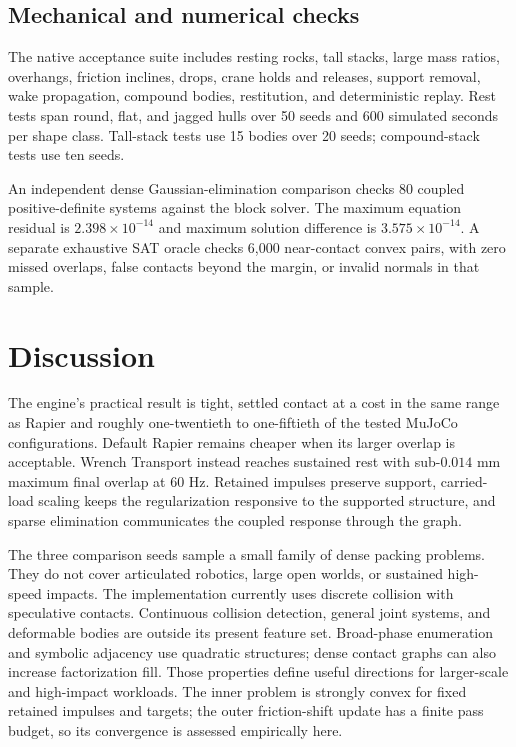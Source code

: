 \documentclass[10pt,letterpaper]{article}
\begin{document}
\subsection{Mechanical and numerical checks}
The native acceptance suite includes resting rocks, tall stacks, large mass ratios, overhangs, friction inclines, drops, crane holds and releases, support removal, wake propagation, compound bodies, restitution, and deterministic replay. Rest tests span round, flat, and jagged hulls over 50 seeds and 600 simulated seconds per shape class. Tall-stack tests use 15 bodies over 20 seeds; compound-stack tests use ten seeds.

An independent dense Gaussian-elimination comparison checks 80 coupled positive-definite systems against the block solver. The maximum equation residual is $2.398\times10^{-14}$ and maximum solution difference is $3.575\times10^{-14}$. A separate exhaustive SAT oracle checks 6,000 near-contact convex pairs, with zero missed overlaps, false contacts beyond the margin, or invalid normals in that sample.

\newpage
\section{Discussion}
The engine's practical result is tight, settled contact at a cost in the same range as Rapier and roughly one-twentieth to one-fiftieth of the tested MuJoCo configurations. Default Rapier remains cheaper when its larger overlap is acceptable. Wrench Transport instead reaches sustained rest with sub-$0.014$ mm maximum final overlap at 60 Hz. Retained impulses preserve support, carried-load scaling keeps the regularization responsive to the supported structure, and sparse elimination communicates the coupled response through the graph.

The three comparison seeds sample a small family of dense packing problems. They do not cover articulated robotics, large open worlds, or sustained high-speed impacts. The implementation currently uses discrete collision with speculative contacts. Continuous collision detection, general joint systems, and deformable bodies are outside its present feature set. Broad-phase enumeration and symbolic adjacency use quadratic structures; dense contact graphs can also increase factorization fill. Those properties define useful directions for larger-scale and high-impact workloads. The inner problem is strongly convex for fixed retained impulses and targets; the outer friction-shift update has a finite pass budget, so its convergence is assessed empirically here.
\end{document}
